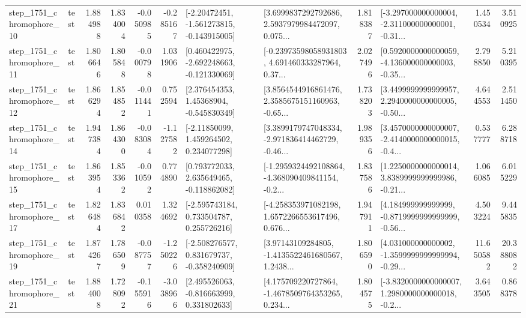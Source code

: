 \begin{tabular}{llrrrrllrlrr}
 step\_1751\_chromophore\_10 &      test &      1.884988 &    1.834004 &     -0.050985 & -0.285167 &   [-2.20472451, -1.561273815, -0.143915005] &  [3.6999837292792686, 2.5937979984472097, 0.075... &       1.818387 &  [-3.297000000000004, -2.311000000000001, -0.31... &            1.450534 &          3.510925 \\
 step\_1751\_chromophore\_11 &      test &      1.806646 &    1.805848 &     -0.000798 &  1.031906 &   [0.460422975, -2.692248663, -0.121330069] &  [-0.23973598058931803, 4.691460333287964, 0.37... &       2.027496 &  [0.5920000000000059, -4.136000000000003, -0.35... &            2.798850 &          5.210395 \\
 step\_1751\_chromophore\_12 &      test &      1.866294 &    1.854852 &     -0.011441 &  0.752594 &     [2.376454353, 1.45368904, -0.545830349] &  [3.8564544916861476, 2.3585675151160963, -0.65... &       1.738203 &  [3.4499999999999957, 2.2940000000000005, -0.50... &            4.644553 &          2.511450 \\
 step\_1751\_chromophore\_14 &      test &      1.947384 &    1.864300 &     -0.083084 & -1.127582 &     [-2.11850099, 1.459264502, 0.234077298] &  [3.3899179747048334, -2.971836414462729, -0.46... &       1.989356 &  [3.4570000000000007, -2.4140000000000015, -0.4... &            0.537777 &          6.288718 \\
 step\_1751\_chromophore\_15 &      test &      1.863954 &    1.853362 &     -0.010592 &  0.774890 &    [0.793772033, 2.635649465, -0.118862082] &  [-1.2959324492108864, -4.368090409841154, -0.2... &       1.837586 &  [1.2250000000000014, 3.8389999999999986, -0.21... &            1.066085 &          6.015229 \\
 step\_1751\_chromophore\_17 &      test &      1.826484 &    1.836842 &      0.010358 &  1.324692 &    [-2.595743184, 0.733504787, 0.255726216] &  [-4.258353971082198, 1.6572266553617496, 0.676... &       1.947911 &  [4.184999999999999, -0.8719999999999999, -0.56... &            4.503224 &          9.445835 \\
 step\_1751\_chromophore\_19 &      test &      1.874267 &    1.786509 &     -0.087757 & -1.250226 &   [-2.508276577, 0.831679737, -0.358240909] &  [3.97143109284805, -1.4135522461680567, 1.2438... &       1.806590 &  [4.031000000000002, -1.3599999999999994, -0.29... &           11.650582 &         20.388082 \\
 step\_1751\_chromophore\_21 &      test &      1.884008 &    1.728092 &     -0.155916 & -3.038966 &    [2.495526063, -0.816663999, 0.331802633] &  [4.175709220727864, -1.4678509764353265, 0.234... &       1.804575 &  [-3.8320000000000007, 1.2980000000000018, -0.2... &            3.643505 &          0.868378 \\

\end{tabular}
